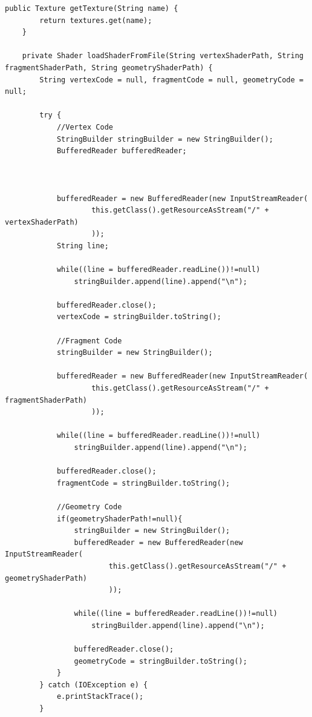 \documentclass[12pt, 
openright, 
oneside, 
a4paper,    
brazil]{facom-ufu-abntex2}
\begin{document}
\begin{lstlisting}[caption=Classe Resource Manager]
    public Texture getTexture(String name) {
        return textures.get(name);
    }

    private Shader loadShaderFromFile(String vertexShaderPath, String fragmentShaderPath, String geometryShaderPath) {
        String vertexCode = null, fragmentCode = null, geometryCode = null;
         
        try {
            //Vertex Code
            StringBuilder stringBuilder = new StringBuilder();
            BufferedReader bufferedReader;
             
             
             
            bufferedReader = new BufferedReader(new InputStreamReader(
                    this.getClass().getResourceAsStream("/" + vertexShaderPath)
                    )); 
            String line;
             
            while((line = bufferedReader.readLine())!=null)
                stringBuilder.append(line).append("\n");
             
            bufferedReader.close();
            vertexCode = stringBuilder.toString();
             
            //Fragment Code
            stringBuilder = new StringBuilder();
             
            bufferedReader = new BufferedReader(new InputStreamReader(
                    this.getClass().getResourceAsStream("/" + fragmentShaderPath)
                    )); 
             
            while((line = bufferedReader.readLine())!=null)
                stringBuilder.append(line).append("\n");
             
            bufferedReader.close();
            fragmentCode = stringBuilder.toString();
             
            //Geometry Code
            if(geometryShaderPath!=null){
                stringBuilder = new StringBuilder();
                bufferedReader = new BufferedReader(new InputStreamReader(
                        this.getClass().getResourceAsStream("/" + geometryShaderPath)
                        )); 
                 
                while((line = bufferedReader.readLine())!=null)
                    stringBuilder.append(line).append("\n");
                 
                bufferedReader.close();
                geometryCode = stringBuilder.toString();
            }
        } catch (IOException e) {
            e.printStackTrace();
        }
         

\end{lstlisting}
\end{document}

